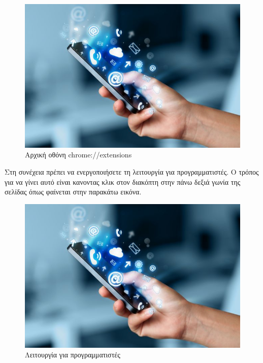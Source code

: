 \documentclass{article}
\begin{document}
\begin{figure}[H]
    \includegraphics[width=\textwidth]{logo}
    \caption*{Αρχική οθόνη chrome://extensions}
\end{figure}

Στη συνέχεια πρέπει να ενεργοποιήσετε τη λειτουργία για προγραμματιστές. Ο τρόπος για να γίνει αυτό είναι κανοντας κλικ στον διακόπτη στην πάνω δεξιά γωνία της σελίδας όπως φαίνεται στην παρακάτω εικόνα.
\begin{figure}[H]
    \includegraphics[width=\textwidth]{logo}
    \caption*{Λειτουργία για προγραμματιστές}
\end{figure}
\end{document}
